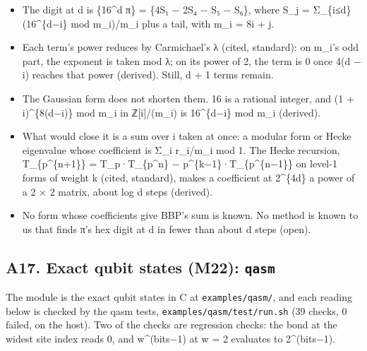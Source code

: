 \begin{itemize}
\begin{itemize}
\item The digit at d is \{16\textasciicircum{}d π\} = \{4S₁ − 2S₄ − S₅ − S₆\}, where S\_\allowbreak{}j = Σ\_\allowbreak{}\{i≤d\} (16\textasciicircum{}\{d−i\} mod m\_\allowbreak{}i)/m\_\allowbreak{}i plus a tail, with m\_\allowbreak{}i = 8i + j.
\item Each term's power reduces by Carmichael's λ (cited, standard): on m\_\allowbreak{}i's odd part, the exponent is taken mod λ; on its power of 2, the term is 0 once 4(d − i) reaches that power (derived). Still, d + 1 terms remain.
\item The Gaussian form does not shorten them. 16 is a rational integer, and (1 + i)\textasciicircum{}\{8(d−i)\} mod m\_\allowbreak{}i in ℤ[i]/(m\_\allowbreak{}i) is 16\textasciicircum{}\{d−i\} mod m\_\allowbreak{}i (derived).
\item What would close it is a sum over i taken at once: a modular form or Hecke eigenvalue whose coefficient is Σ\_\allowbreak{}i r\_\allowbreak{}i/m\_\allowbreak{}i mod 1. The Hecke recursion, T\_\allowbreak{}\{p\textasciicircum{}\{n+1\}\} = T\_\allowbreak{}p·T\_\allowbreak{}\{p\textasciicircum{}n\} − p\textasciicircum{}\{k−1\}·T\_\allowbreak{}\{p\textasciicircum{}\{n−1\}\} on level-1 forms of weight k (cited, standard), makes a coefficient at 2\textasciicircum{}\{4d\} a power of a 2 × 2 matrix, about log d steps (derived).
\item No form whose coefficients give BBP's sum is known. No method is known to us that finds π's hex digit at d in fewer than about d steps (open).
\end{itemize}
\end{itemize}

\subsection{\texorpdfstring{A17. Exact qubit states (M22): \texttt{qasm}}{A17. Exact qubit states (M22): qasm}}

The module is the exact qubit states in C at \texttt{examples/\allowbreak{}qasm/\allowbreak{}}, and each reading below is checked by the qasm tests, \texttt{examples/\allowbreak{}qasm/\allowbreak{}test/\allowbreak{}run.\allowbreak{}sh} (39 checks, 0 failed, on the host). Two of the checks are regression checks: the bond at the widest site index reads 0, and w\textasciicircum{}(bits−1) at w = 2 evaluates to 2\textasciicircum{}(bits−1).

